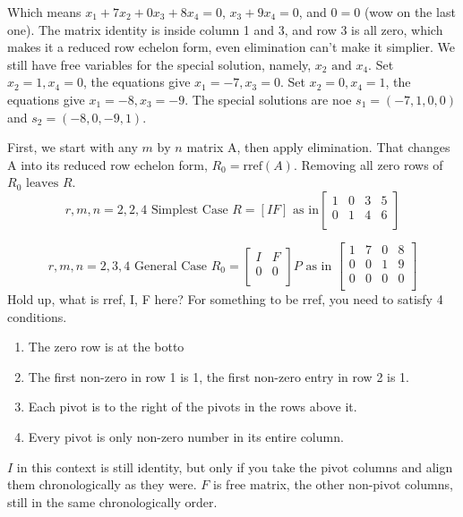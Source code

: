 Which means \(x_1 + 7x_2 + 0x_3 + 8x_4 = 0\), \(x_3 + 9x_4 = 0\), and \(0 = 0\) (wow on the last one). The matrix identity is inside column 1 and 3, and row 3 is all zero, which makes it a reduced row echelon form, even elimination can't make it simplier. We still have free variables for the special solution, namely, \(x_2 \text{ and } x_4\).   
Set \(x_2 = 1, x_4 = 0\), the equations give \(x_1 = -7, x_3 = 0\).
Set \(x_2 = 0, x_4 = 1\), the equations give \(x_1 = -8, x_3 = -9\).
The special solutions are noe \(s_1 = (-7, 1, 0, 0)\) and \(s_2 = (-8 ,0 , -9, 1)\).

First, we start with any \(m \text{ by } n\) matrix A, then apply elimination. That changes A into its reduced row echelon form, \(R_0 = \text{rref} (A)\). Removing all zero rows of \(R_0 \text{ leaves } R\).
\[
    r, m, n = 2, 2, 4 \text{ Simplest Case } R = [I F]
    \text{ as in}
    \begin{bmatrix}
        1 & 0 & 3 & 5  \\
        0 & 1 & 4 & 6  \\
    \end{bmatrix}
\]    

\[
    r, m, n = 2, 3, 4 \text{ General Case } 
    R_0 =
    \begin{bmatrix}
        I & F  \\
        0 & 0  \\
    \end{bmatrix}
    P
    \text{ as in }
    \begin{bmatrix}
        1 & 7 & 0 & 8  \\
        0 & 0 & 1 & 9  \\
        0 & 0 & 0 & 0  \\
    \end{bmatrix}
\] 
Hold up, what is rref, I, F here?
For something to be rref, you need to satisfy 4 conditions.
\begin{enumerate}
    \item The zero row is at the botto
    \item The first non-zero in row 1 is 1, the first non-zero entry in row 2 is 1. 
    \item Each pivot is to the right of the pivots in the rows above it.
    \item Every pivot is only non-zero number in its entire column.
\end{enumerate}

\(I\) in this context is still identity, but only if you take the pivot columns and align them chronologically as they were.
\(F\) is free matrix, the other non-pivot columns, still in the same chronologically order.


